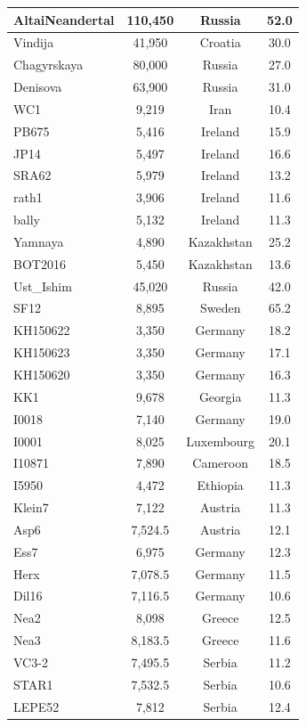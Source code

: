\begin{longtable}{|l|c|c|c|}
AltaiNeandertal & 110,450 & Russia & 52.0 \\ \hline
Vindija & 41,950 & Croatia & 30.0 \\ \hline
Chagyrskaya & 80,000 & Russia & 27.0 \\ \hline
Denisova & 63,900 & Russia & 31.0 \\ \hline
WC1 & 9,219 & Iran & 10.4 \\ \hline
PB675 & 5,416 & Ireland & 15.9 \\ \hline
JP14 & 5,497 & Ireland & 16.6 \\ \hline
SRA62 & 5,979 & Ireland & 13.2 \\ \hline
rath1 & 3,906 & Ireland & 11.6 \\ \hline
bally & 5,132 & Ireland & 11.3 \\ \hline
Yamnaya & 4,890 & Kazakhstan & 25.2 \\ \hline
BOT2016 & 5,450 & Kazakhstan & 13.6 \\ \hline
Ust\_Ishim & 45,020 & Russia & 42.0 \\ \hline
SF12 & 8,895 & Sweden & 65.2 \\ \hline
KH150622 & 3,350 & Germany & 18.2 \\ \hline
KH150623 & 3,350 & Germany & 17.1 \\ \hline
KH150620 & 3,350 & Germany & 16.3 \\ \hline
KK1 & 9,678 & Georgia & 11.3 \\ \hline
I0018 & 7,140 & Germany & 19.0 \\ \hline
I0001 & 8,025 & Luxembourg & 20.1 \\ \hline
I10871 & 7,890 & Cameroon & 18.5 \\ \hline
I5950 & 4,472 & Ethiopia & 11.3 \\ \hline
Klein7 & 7,122 & Austria & 11.3 \\ \hline
Asp6 & 7,524.5 & Austria & 12.1 \\ \hline
Ess7 & 6,975 & Germany & 12.3 \\ \hline
Herx & 7,078.5 & Germany & 11.5 \\ \hline
Dil16 & 7,116.5 & Germany & 10.6 \\ \hline
Nea2 & 8,098 & Greece & 12.5 \\ \hline
Nea3 & 8,183.5 & Greece & 11.6 \\ \hline
VC3-2 & 7,495.5 & Serbia & 11.2 \\ \hline
STAR1 & 7,532.5 & Serbia & 10.6 \\ \hline
LEPE52 & 7,812 & Serbia & 12.4 \\ \hline

\end{longtable}
